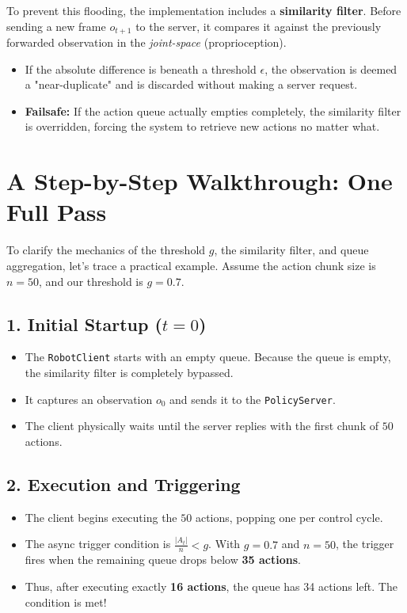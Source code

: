 \documentclass[11pt,a4paper]{article}
\begin{document}
To prevent this flooding, the implementation includes a \textbf{similarity filter}. Before sending a new frame $o_{t+1}$ to the server, it compares it against the previously forwarded observation in the \textit{joint-space} (proprioception).
\begin{itemize}
    \item If the absolute difference is beneath a threshold $\epsilon$, the observation is deemed a "near-duplicate" and is discarded without making a server request.
    \item \textbf{Failsafe:} If the action queue actually empties completely, the similarity filter is overridden, forcing the system to retrieve new actions no matter what.
\end{itemize}

\section{A Step-by-Step Walkthrough: One Full Pass}
To clarify the mechanics of the threshold $g$, the similarity filter, and queue aggregation, let's trace a practical example. Assume the action chunk size is $n = 50$, and our threshold is $g = 0.7$.

\subsection{1. Initial Startup ($t = 0$)}
\begin{itemize}
    \item The \texttt{RobotClient} starts with an empty queue. Because the queue is empty, the similarity filter is completely bypassed.
    \item It captures an observation $o_0$ and sends it to the \texttt{PolicyServer}.
    \item The client physically waits until the server replies with the first chunk of $50$ actions.
\end{itemize}

\subsection{2. Execution and Triggering}
\begin{itemize}
    \item The client begins executing the $50$ actions, popping one per control cycle.
    \item The async trigger condition is $\frac{|A_t|}{n} < g$. With $g = 0.7$ and $n = 50$, the trigger fires when the remaining queue drops below \textbf{35 actions}.
    \item Thus, after executing exactly \textbf{16 actions}, the queue has 34 actions left. The condition is met!
\end{itemize}
\end{document}
